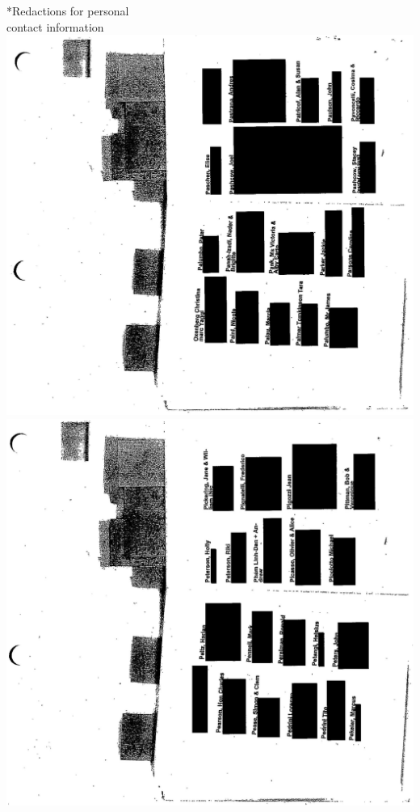 \documentclass[10pt]{article}
\begin{document}
*Redactions for personal\\
contact information\\
\includegraphics[max width=\textwidth, center]{2025_02_27_dd68c3d38de88f0516d9g-164}\\
\includegraphics[max width=\textwidth, center]{2025_02_27_dd68c3d38de88f0516d9g-165}\\
\end{document}
